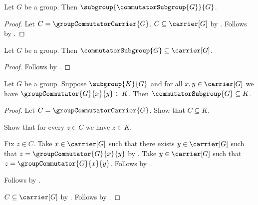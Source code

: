 \begin{proposition}\label{commutator_subgroup_is_subgroup}
    Let $G$ be a group.
    Then $\subgroup{\commutatorSubgroup{G}}{G}$.
\end{proposition}
\begin{proof}
    Let $C=\groupCommutatorCarrier{G}$.
    $C\subseteq\carrier[G]$ by
        .
    Follows by
        .
\end{proof}

\begin{corollary}\label{commutator_subgroup_subseteq}
    Let $G$ be a group.
    Then $\commutatorSubgroup{G}\subseteq\carrier[G]$.
\end{corollary}
\begin{proof}
    Follows by
        .
\end{proof}

\begin{theorem}\label{commutator_subgroup_least}
    Let $G$ be a group.
    Suppose $\subgroup{K}{G}$ and for all $x,y\in\carrier[G]$ we have
        $\groupCommutator{G}{x}{y}\in K$.
    Then $\commutatorSubgroup{G}\subseteq K$.
\end{theorem}
\begin{proof}
    Let $C=\groupCommutatorCarrier{G}$.
    Show that $C\subseteq K$.
    \begin{subproof}
        Show that for every $z\in C$ we have $z\in K$.
        \begin{subproof}
            Fix $z\in C$.
            Take $x\in\carrier[G]$ such that there exists
                $y\in\carrier[G]$ such that
                $z=\groupCommutator{G}{x}{y}$ by
                .
            Take $y\in\carrier[G]$ such that
                $z=\groupCommutator{G}{x}{y}$.
            Follows by \auto.
        \end{subproof}
        Follows by .
    \end{subproof}
    $C\subseteq\carrier[G]$ by
        .
    Follows by
        .
\end{proof}

